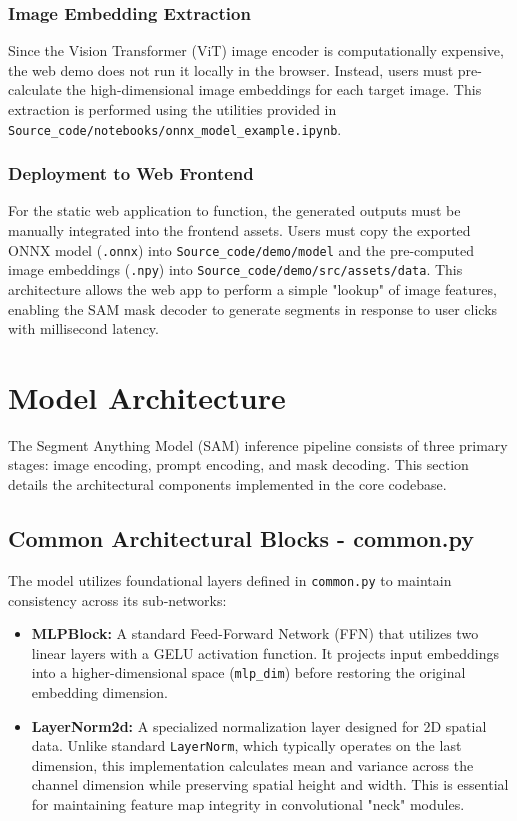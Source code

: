 \subsubsection{Image Embedding Extraction}
Since the Vision Transformer (ViT) image encoder is computationally expensive, the web demo does not run it locally in the browser. Instead, users must pre-calculate the high-dimensional image embeddings for each target image. This extraction is performed using the utilities provided in \texttt{Source\_code/notebooks/onnx\_model\_example.ipynb}.

\subsubsection{Deployment to Web Frontend}
For the static web application to function, the generated outputs must be manually integrated into the frontend assets. Users must copy the exported ONNX model (\texttt{.onnx}) into \texttt{Source\_code/demo/model} and the pre-computed image embeddings (\texttt{.npy}) into \texttt{Source\_code/demo/src/assets/data}. This architecture allows the web app to perform a simple "lookup" of image features, enabling the SAM mask decoder to generate segments in response to user clicks with millisecond latency.

\section{Model Architecture}
The Segment Anything Model (SAM) inference pipeline consists of three primary stages: image encoding, prompt encoding, and mask decoding. This section details the architectural components implemented in the core codebase.

\subsection{Common Architectural Blocks - common.py}
The model utilizes foundational layers defined in \texttt{common.py} to maintain consistency across its sub-networks:
\begin{itemize}
	\item \textbf{MLPBlock:} A standard Feed-Forward Network (FFN) that utilizes two linear layers with a GELU activation function. It projects input embeddings into a higher-dimensional space (\texttt{mlp\_dim}) before restoring the original embedding dimension.
	\item \textbf{LayerNorm2d:} A specialized normalization layer designed for 2D spatial data. Unlike standard \texttt{LayerNorm}, which typically operates on the last dimension, this implementation calculates mean and variance across the channel dimension while preserving spatial height and width. This is essential for maintaining feature map integrity in convolutional "neck" modules.
\end{itemize}

